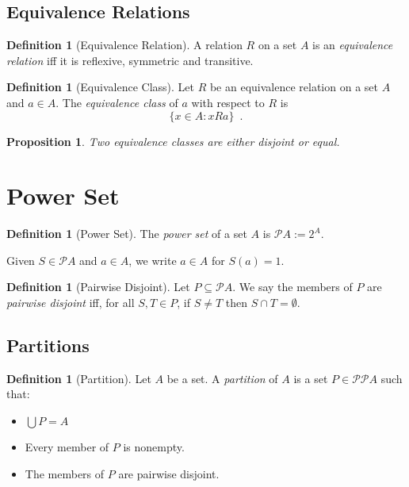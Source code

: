 \documentclass{book}
\newtheorem{prop}[ax]{Proposition}
\theoremstyle{definition}
\newtheorem{df}[ax]{Definition}
\begin{document}
\subsection{Equivalence Relations}

\begin{df}[Equivalence Relation]
A relation $R$ on a set $A$ is an \emph{equivalence relation} iff it is reflexive, symmetric and transitive.
\end{df}

\begin{df}[Equivalence Class]
Let $R$ be an equivalence relation on a set $A$ and $a \in A$. The \emph{equivalence class} of $a$ with respect to $R$ is
\[ \{ x \in A : xRa \} \enspace . \]
\end{df}

\begin{prop}
Two equivalence classes are either disjoint or equal.
\end{prop}


\section{Power Set}

\begin{df}[Power Set]
The \emph{power set} of a set $A$ is $\mathcal{P} A := 2^A$.

Given $S \in \mathcal{P} A$ and $a \in A$, we write $a \in A$ for $S(a) = 1$.
\end{df}

\begin{df}[Pairwise Disjoint]
Let $P \subseteq \mathcal{P} A$. We say the members of $P$ are \emph{pairwise disjoint} iff, for all $S,T \in P$, if $S \neq T$ then $S \cap T = \emptyset$.
\end{df}

\subsection{Partitions}

\begin{df}[Partition]
Let $A$ be a set. A \emph{partition} of $A$ is a set $P \in \mathcal{P} \mathcal{P} A$ such that:
\begin{itemize}
\item $\bigcup P = A$
\item Every member of $P$ is nonempty.
\item The members of $P$ are pairwise disjoint.
\end{itemize}
\end{df}
\end{document}
